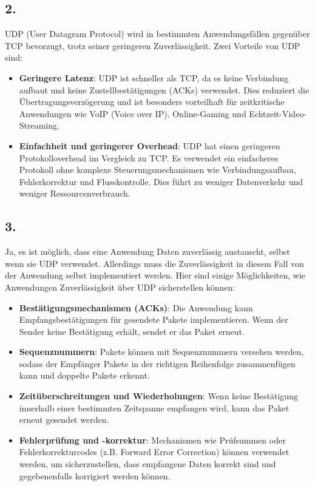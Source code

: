 \documentclass[a4paper]{scrartcl}
\begin{document}
\subsection*{2.}

UDP (User Datagram Protocol) wird in bestimmten Anwendungsfällen gegenüber TCP bevorzugt, trotz seiner geringeren Zuverlässigkeit. Zwei Vorteile von UDP sind:

\begin{itemize}
    \item \textbf{Geringere Latenz}: UDP ist schneller als TCP, da es keine Verbindung aufbaut und keine Zustellbestätigungen (ACKs) verwendet. Dies reduziert die Übertragungsverzögerung und ist besonders vorteilhaft für zeitkritische Anwendungen wie VoIP (Voice over IP), Online-Gaming und Echtzeit-Video-Streaming.
    \item \textbf{Einfachheit und geringerer Overhead}: UDP hat einen geringeren Protokolloverhead im Vergleich zu TCP. Es verwendet ein einfacheres Protokoll ohne komplexe Steuerungsmechanismen wie Verbindungsaufbau, Fehlerkorrektur und Flusskontrolle. Dies führt zu weniger Datenverkehr und weniger Ressourcenverbrauch.
\end{itemize}

\subsection*{3.}

Ja, es ist möglich, dass eine Anwendung Daten zuverlässig austauscht, selbst wenn sie UDP verwendet. Allerdings muss die Zuverlässigkeit in diesem Fall von der Anwendung selbst implementiert werden. Hier sind einige Möglichkeiten, wie Anwendungen Zuverlässigkeit über UDP sicherstellen können:

\begin{itemize}
    \item \textbf{Bestätigungsmechanismen (ACKs)}: Die Anwendung kann Empfangsbestätigungen für gesendete Pakete implementieren. Wenn der Sender keine Bestätigung erhält, sendet er das Paket erneut.
    \item \textbf{Sequenznummern}: Pakete können mit Sequenznummern versehen werden, sodass der Empfänger Pakete in der richtigen Reihenfolge zusammenfügen kann und doppelte Pakete erkennt.
    \item \textbf{Zeitüberschreitungen und Wiederholungen}: Wenn keine Bestätigung innerhalb einer bestimmten Zeitspanne empfangen wird, kann das Paket erneut gesendet werden.
    \item \textbf{Fehlerprüfung und -korrektur}: Mechanismen wie Prüfsummen oder Fehlerkorrekturcodes (z.B. Forward Error Correction) können verwendet werden, um sicherzustellen, dass empfangene Daten korrekt sind und gegebenenfalls korrigiert werden können.
\end{itemize}
\end{document}
